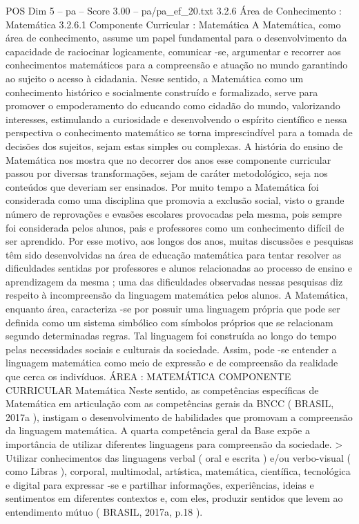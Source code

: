 \begin{textsample}{POS Dim 5 – pa – Score 3.00 – pa/pa\_ef\_20.txt}  \label{ex:f5_pos_249}
3.2.6 Área de Conhecimento : Matemática 3.2.6.1 Componente Curricular : Matemática A Matemática, como área de conhecimento, assume um papel fundamental para o desenvolvimento da capacidade de raciocinar logicamente, comunicar -se, argumentar e recorrer aos conhecimentos matemáticos para a compreensão e atuação no mundo garantindo ao sujeito o acesso à cidadania.
Nesse sentido, a Matemática como um conhecimento histórico e socialmente construído e formalizado, serve para promover o empoderamento do educando como cidadão do mundo, valorizando interesses, estimulando a curiosidade e desenvolvendo o espírito científico e nessa perspectiva o conhecimento matemático se torna imprescindível para a tomada de decisões dos sujeitos, sejam estas simples ou complexas.
A história do ensino de Matemática nos mostra que no decorrer dos anos esse componente curricular passou por diversas transformações, sejam de caráter metodológico, seja nos conteúdos que deveriam ser ensinados.
Por muito tempo a Matemática foi considerada como uma disciplina que promovia a exclusão social, visto o grande número de reprovações e evasões escolares provocadas pela mesma, pois sempre foi considerada pelos alunos, pais e professores como um conhecimento difícil de ser aprendido.
Por esse motivo, aos longos dos anos, muitas discussões e pesquisas têm sido desenvolvidas na área de educação matemática para tentar resolver as dificuldades sentidas por professores e alunos relacionadas ao processo de ensino e aprendizagem da mesma ; uma das dificuldades observadas nessas pesquisas diz respeito à incompreensão da linguagem matemática pelos alunos.
A Matemática, enquanto área, caracteriza -se por possuir uma linguagem própria que pode ser definida como um sistema simbólico com símbolos próprios que se relacionam segundo determinadas regras.
Tal linguagem foi construída ao longo do tempo pelas necessidades sociais e culturais da sociedade.
Assim, pode -se entender a linguagem matemática como meio de expressão e de compreensão da realidade que cerca os indivíduos.
ÁREA : MATEMÁTICA COMPONENTE CURRICULAR Matemática Neste sentido, as competências específicas de Matemática em articulação com as competências gerais da BNCC ( BRASIL, 2017a ), instigam o desenvolvimento de habilidades que promovam a compreensão da linguagem matemática.
A quarta competência geral da Base expõe a importância de utilizar diferentes linguagens para compreensão da sociedade. > Utilizar conhecimentos das linguagens verbal ( oral e escrita ) e/ou verbo-visual ( como Libras ), corporal, multimodal, artística, matemática, científica, tecnológica e digital para expressar -se e partilhar informações, experiências, ideias e sentimentos em diferentes contextos e, com eles, produzir sentidos que levem ao entendimento mútuo ( BRASIL, 2017a, p.18 ).

\end{textsample}
